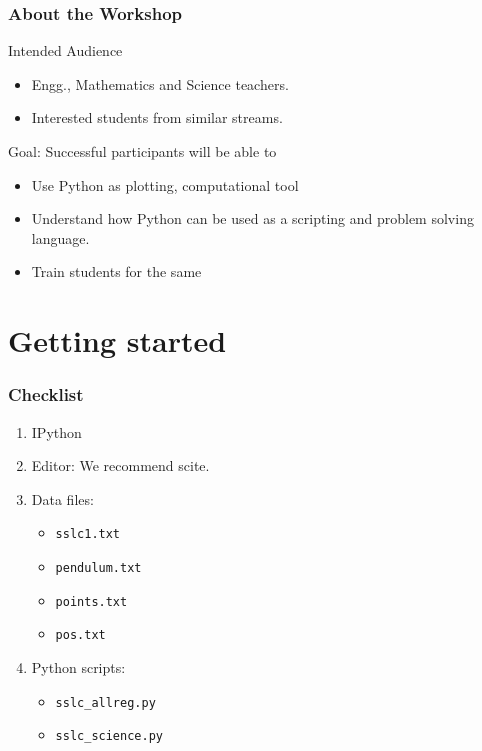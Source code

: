 \documentclass[14pt,compress]{beamer}
\newcommand{\typ}[1]{\lstinline{#1}}
\begin{document}
\begin{frame}
  \frametitle{About the Workshop}
  \begin{block}{Intended Audience}
  \begin{itemize}
       \item Engg., Mathematics and Science teachers.
       \item Interested students from similar streams.
  \end{itemize}
  \end{block}  

  \begin{block}{Goal: Successful participants will be able to}
    \begin{itemize}
      \item Use Python as plotting, computational tool
      \item Understand how Python can be used as a scripting and problem solving language.
      \item Train students for the same
    \end{itemize}
  \end{block}
\end{frame}

\section{Getting started}
\begin{frame}
\frametitle{Checklist}
  \begin{enumerate}
    \item IPython
    \item Editor: We recommend scite.
    \item Data files: 
      \begin{itemize}
      \item \typ{sslc1.txt}
      \item \typ{pendulum.txt}
      \item \typ{points.txt}
      \item \typ{pos.txt}
      \end{itemize}
    \item Python scripts: 
      \begin{itemize}
      \item \typ{sslc_allreg.py}
      \item \typ{sslc_science.py}
      \end{itemize}
  \end{enumerate}
\end{frame}
\end{document}
